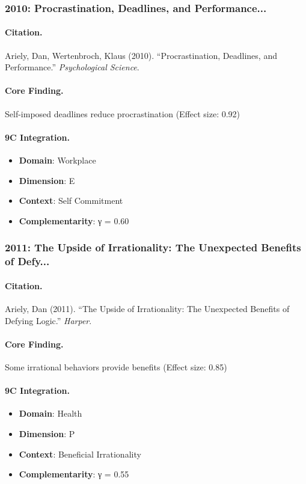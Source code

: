 \subsubsection{2010: Procrastination, Deadlines, and Performance...}

\paragraph{Citation.}
Ariely, Dan, Wertenbroch, Klaus (2010). ``Procrastination, Deadlines, and Performance.''
\textit{Psychological Science}.

\paragraph{Core Finding.}
Self-imposed deadlines reduce procrastination (Effect size: 0.92)

\paragraph{9C Integration.}
\begin{itemize}[nosep]
  \item \textbf{Domain}: Workplace
  \item \textbf{Dimension}: E
  \item \textbf{Context}: Self Commitment
  \item \textbf{Complementarity}: γ = 0.60
\end{itemize}

\subsubsection{2011: The Upside of Irrationality: The Unexpected Benefits of Defy...}

\paragraph{Citation.}
Ariely, Dan (2011). ``The Upside of Irrationality: The Unexpected Benefits of Defying Logic.''
\textit{Harper}.

\paragraph{Core Finding.}
Some irrational behaviors provide benefits (Effect size: 0.85)

\paragraph{9C Integration.}
\begin{itemize}[nosep]
  \item \textbf{Domain}: Health
  \item \textbf{Dimension}: P
  \item \textbf{Context}: Beneficial Irrationality
  \item \textbf{Complementarity}: γ = 0.55
\end{itemize}

